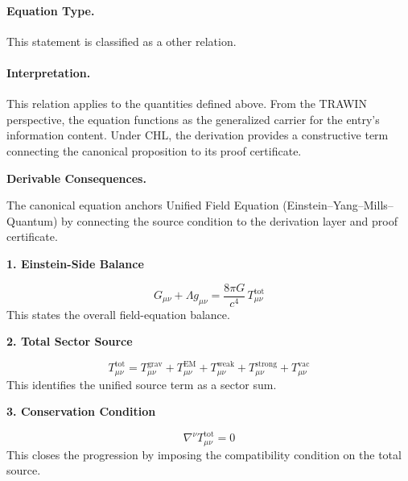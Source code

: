 \paragraph{Equation Type.}
This statement is classified as a other relation.

\paragraph{Interpretation.}
This relation applies to the quantities defined above. From the TRAWIN perspective, the equation functions as the generalized carrier for the entry’s information content. Under CHL, the derivation provides a constructive term connecting the canonical proposition to its proof certificate.

\par\vspace{0.35em}
\noindent\textbf{Derivable Consequences.}\quad
\begingroup
\footnotesize
\raggedright
The canonical equation anchors Unified Field Equation (Einstein--Yang--Mills--Quantum) by connecting the source condition to the derivation layer and proof certificate.
\par\endgroup

\noindent\textbf{1. Einstein-Side Balance}\par
\[
G_{\mu\nu}+\Lambda g_{\mu\nu}
=
\frac{8\pi G}{c^4}\,T_{\mu\nu}^{\mathrm{tot}}
\]
\noindent This states the overall field-equation balance.\par
\noindent\textbf{2. Total Sector Source}\par
\[
T_{\mu\nu}^{\mathrm{tot}}
=
T_{\mu\nu}^{\mathrm{grav}}+
T_{\mu\nu}^{\mathrm{EM}}+
T_{\mu\nu}^{\mathrm{weak}}+
T_{\mu\nu}^{\mathrm{strong}}+
T_{\mu\nu}^{\mathrm{vac}}
\]
\noindent This identifies the unified source term as a sector sum.\par
\noindent\textbf{3. Conservation Condition}\par
\[
\nabla^{\nu}T_{\mu\nu}^{\mathrm{tot}}=0
\]
\noindent This closes the progression by imposing the compatibility condition on the total source.\par

